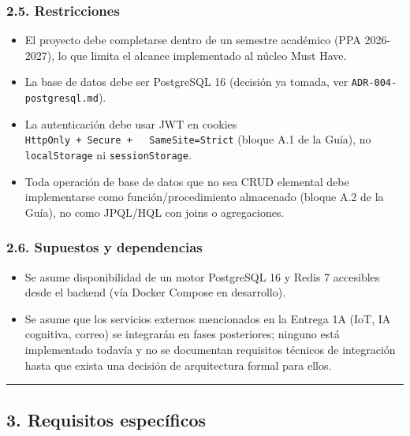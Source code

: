 \documentclass[
]{article}
\providecommand{\tightlist}{%
  \setlength{\itemsep}{0pt}\setlength{\parskip}{0pt}}
\begin{document}
\hypertarget{restricciones}{%
\subsubsection{2.5. Restricciones}\label{restricciones}}

\begin{itemize}
\tightlist
\item
  El proyecto debe completarse dentro de un semestre académico (PPA
  2026-2027), lo que limita el alcance implementado al núcleo Must Have.
\item
  La base de datos debe ser PostgreSQL 16 (decisión ya tomada, ver
  \texttt{ADR-004-postgresql.md}).
\item
  La autenticación debe usar JWT en cookies
  \texttt{HttpOnly\ +\ Secure\ +\ \ \ SameSite=Strict} (bloque A.1 de la
  Guía), no \texttt{localStorage} ni \texttt{sessionStorage}.
\item
  Toda operación de base de datos que no sea CRUD elemental debe
  implementarse como función/procedimiento almacenado (bloque A.2 de la
  Guía), no como JPQL/HQL con joins o agregaciones.
\end{itemize}

\hypertarget{supuestos-y-dependencias}{%
\subsubsection{2.6. Supuestos y
dependencias}\label{supuestos-y-dependencias}}

\begin{itemize}
\tightlist
\item
  Se asume disponibilidad de un motor PostgreSQL 16 y Redis 7 accesibles
  desde el backend (vía Docker Compose en desarrollo).
\item
  Se asume que los servicios externos mencionados en la Entrega 1A (IoT,
  IA cognitiva, correo) se integrarán en fases posteriores; ninguno está
  implementado todavía y no se documentan requisitos técnicos de
  integración hasta que exista una decisión de arquitectura formal para
  ellos.
\end{itemize}

\begin{center}\rule{0.5\linewidth}{0.5pt}\end{center}

\hypertarget{requisitos-especuxedficos}{%
\subsection{3. Requisitos específicos}\label{requisitos-especuxedficos}}
\end{document}
